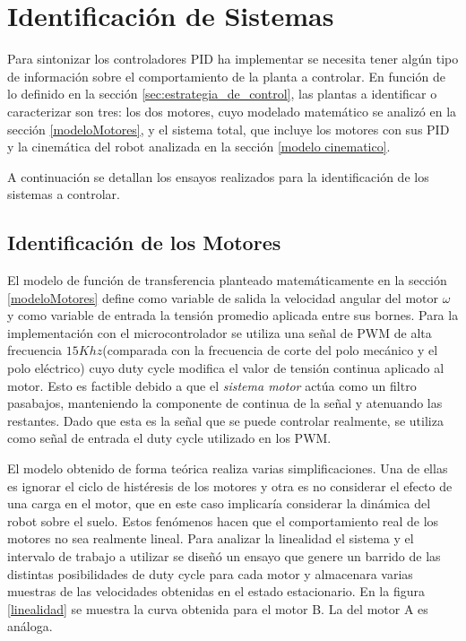 \documentclass[10pt,conference,a4paper,onecolumn]{article}%
\begin{document}
\section{Identificación de Sistemas}
\label{sec:identifSist}
Para sintonizar los controladores PID ha implementar se necesita tener algún tipo de información sobre el comportamiento de la planta a controlar. En función de lo definido en la sección \ref{sec:estrategia_de_control}, las plantas a identificar o caracterizar son tres: los dos motores, cuyo modelado matemático se analizó en la sección \ref{modeloMotores}, y el sistema total, que incluye los motores con sus PID y la cinemática del robot analizada en la sección \ref{modelo cinematico}.

A continuación se detallan los ensayos realizados para la identificación de los sistemas a controlar.
\subsection{Identificación de los Motores}
El modelo de función de transferencia planteado matemáticamente en la sección \ref{modeloMotores} define como variable de salida la velocidad angular del motor $\omega $ y como variable de entrada la tensión promedio aplicada entre sus bornes. Para la implementación con el microcontrolador se utiliza una señal de PWM de alta frecuencia $15Khz$(comparada con la frecuencia de corte del polo mecánico y el polo eléctrico) cuyo duty cycle modifica el valor de tensión continua aplicado al motor. Esto es factible debido a que el \textit{ sistema motor} actúa como un filtro pasabajos, manteniendo la componente de continua de la señal y atenuando las restantes. Dado que esta es la señal que se puede controlar realmente, se utiliza como señal de entrada el duty cycle utilizado en los PWM.

El modelo obtenido de forma teórica realiza varias simplificaciones. Una de ellas es ignorar el ciclo de histéresis de los motores y otra es no considerar el efecto de una carga en el motor, que en este caso implicaría considerar la dinámica del robot sobre el suelo. Estos fenómenos hacen que el comportamiento real de los motores no sea realmente lineal. Para analizar la linealidad el sistema y el intervalo de trabajo a utilizar se diseñó un ensayo que genere un barrido de las distintas posibilidades de duty cycle para cada motor y almacenara varias muestras de las velocidades obtenidas en el estado estacionario. En la figura \ref{linealidad} se muestra la curva obtenida para el motor B. La del motor A es análoga. %
\end{document}
